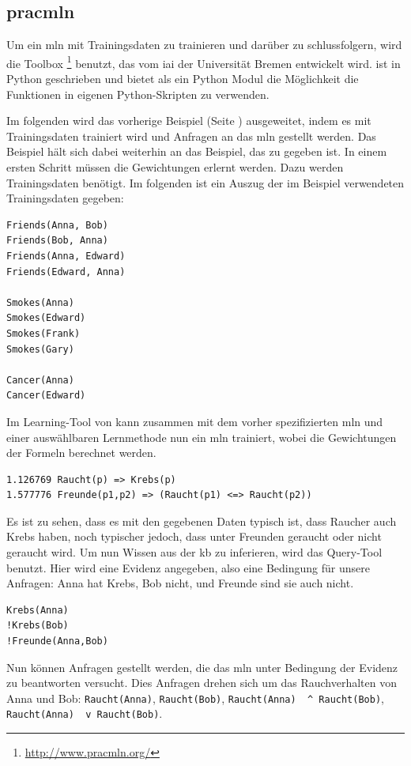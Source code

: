 \subsection{pracmln}
\label{subsec:pracmln}
Um ein \gls{mln} mit Trainingsdaten zu trainieren und darüber zu schlussfolgern, wird die Toolbox \pracmln\footnote{\url{http://www.pracmln.org/}} benutzt, das vom \gls{iai} der Universität Bremen entwickelt wird. \pracmln ist in Python geschrieben und bietet als ein Python Modul die Möglichkeit die Funktionen in eigenen Python-Skripten zu verwenden. \par 
Im folgenden wird das vorherige Beispiel (Seite \pageref{mlnexample}) ausgeweitet, indem es mit Trainingsdaten trainiert wird und Anfragen an das \gls{mln} gestellt werden. Das Beispiel hält sich dabei weiterhin an das Beispiel, das zu \pracmln gegeben ist.  \newline
In einem ersten Schritt müssen die Gewichtungen erlernt werden. Dazu werden Trainingsdaten benötigt. Im folgenden ist ein Auszug der im Beispiel verwendeten Trainingsdaten gegeben: 
\begin{lstlisting}[backgroundcolor=\color{backcolour}]
Friends(Anna, Bob)
Friends(Bob, Anna)
Friends(Anna, Edward)
Friends(Edward, Anna)  

Smokes(Anna)
Smokes(Edward)
Smokes(Frank)
Smokes(Gary)

Cancer(Anna)
Cancer(Edward)
\end{lstlisting}  
Im Learning-Tool von \pracmln kann zusammen mit dem vorher spezifizierten \gls{mln} und einer auswählbaren Lernmethode nun ein \gls{mln} trainiert, wobei die Gewichtungen der Formeln berechnet werden.     
\begin{lstlisting}[backgroundcolor=\color{backcolour}]
1.126769 Raucht(p) => Krebs(p)
1.577776 Freunde(p1,p2) => (Raucht(p1) <=> Raucht(p2))
\end{lstlisting}  
Es ist zu sehen, dass es mit den gegebenen Daten typisch ist, dass Raucher auch Krebs haben, noch typischer jedoch, dass unter Freunden geraucht oder nicht geraucht wird.\newline
Um nun Wissen aus der \gls{kb} zu inferieren, wird das Query-Tool benutzt. Hier wird eine Evidenz angegeben, also eine Bedingung für unsere Anfragen: Anna hat Krebs, Bob nicht, und Freunde sind sie auch nicht. 
\begin{lstlisting}[backgroundcolor=\color{backcolour}]
Krebs(Anna)
!Krebs(Bob)
!Freunde(Anna,Bob)
\end{lstlisting} 
Nun können Anfragen gestellt werden, die das \gls{mln} unter Bedingung der Evidenz zu beantworten versucht. Dies Anfragen drehen sich um das Rauchverhalten von Anna und Bob: \lstinline[breaklines=true]{Raucht(Anna)}, \lstinline[breaklines=true]{Raucht(Bob)}, \lstinline[breaklines=true]{Raucht(Anna)  ^ Raucht(Bob)}, \lstinline[breaklines=true]{Raucht(Anna)  v Raucht(Bob)}. \newline
